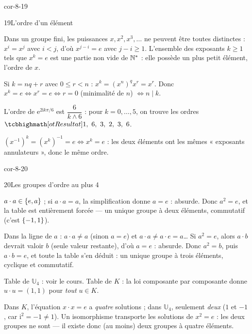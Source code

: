 \begin{blocLivre}{cor-8-19}
\begin{corrige}{19}{L'ordre d'un élément}
\begin{questions}
  \item Dans un groupe fini, les puissances $x,x^{2},x^{3},\dots$ ne
    peuvent être toutes distinctes : $x^{i}=x^{j}$ avec $i<j$, d'où
    $x^{j-i}=e$ avec $j-i\geq1$. L'ensemble des exposants $k\geq1$ tels
    que $x^{k}=e$ est une partie non vide de $\mathbb{N}^{*}$ : elle possède un
    plus petit élément, l'ordre de $x$.
  \item Si $k=nq+r$ avec $0\leq r<n$ :
    $x^{k}=(x^{n})^{q}x^{r}=x^{r}$. Donc $x^{k}=e\iff x^{r}=e\iff r=0$
    (minimalité de $n$) $\iff n\mid k$.
  \item L'ordre de $\mathrm{e}^{2\mathrm{i}k\pi/6}$ est
    $\dfrac{6}{k\wedge6}$ : pour $k=0,\dots,5$, on trouve les ordres
    $\res{1,\ 6,\ 3,\ 2,\ 3,\ 6}$.
  \item $(x^{-1})^{k}=(x^{k})^{-1}=e\iff x^{k}=e$ : les deux éléments ont
    les mêmes « exposants annulateurs », donc le même ordre.
\end{questions}
\end{corrige}
\end{blocLivre}

\begin{blocLivre}{cor-8-20}
\begin{corrige}{20}{Les groupes d'ordre au plus 4}
\begin{questions}
  \item $a\cdot a\in\left\{e,a\right\}$ ; si $a\cdot a=a$, la simplification donne
    $a=e$ : absurde. Donc $a^{2}=e$, et la table est entièrement forcée —
    un unique groupe à deux éléments, commutatif (c'est
    $\left\{-1,1\right\}$).
  \item Dans la ligne de $a$ : $a\cdot a\neq a$ (sinon $a=e$) et
    $a\cdot a\neq a\cdot e=a$\dots{} Si $a^{2}=e$, alors $a\cdot b$
    devrait valoir $b$ (seule valeur restante), d'où $a=e$ : absurde.
    Donc $a^{2}=b$, puis $a\cdot b=e$, et toute la table s'en déduit : un
    unique groupe à trois éléments, cyclique et commutatif.
  \item Table de $\mathbb{U}_4$ : voir le cours. Table de $K$ : la loi
    composante par composante donne $u\cdot u=(1,1)$ pour \emph{tout}
    $u\in K$.
  \item Dans $K$, l'équation $x\cdot x=e$ a \emph{quatre} solutions ; dans
    $\mathbb{U}_4$, seulement \emph{deux} ($1$ et $-1$, car
    $\mathrm{i}^{2}=-1\neq1$). Un isomorphisme transporte les solutions de
    $x^{2}=e$ : les deux groupes ne sont  —
    il existe donc (au moins) deux groupes à quatre éléments.
\end{questions}
\end{corrige}
\end{blocLivre}

